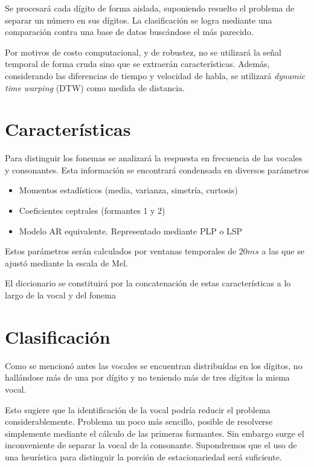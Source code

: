 \documentclass[a4paper]{article}
\begin{document}
		Se procesará cada dígito de forma aislada, suponiendo
		resuelto el problema de separar un número en sus dígitos.
		La clasificación se logra mediante una comparación contra una
		base de datos buscándose el más parecido.

		Por motivos de costo computacional, y de robustez, no se
		utilizará la señal temporal de forma cruda sino que se
		extraerán características.  Además, considerando las
		diferencias de tiempo y velocidad de habla, se utilizará
		\emph{dynamic time warping} (DTW) como medida de distancia.

	\section{Características}
		Para distinguir los fonemas se analizará la
		respuesta en frecuencia de las vocales y consonantes.
		Esta información se encontrará condensada en diversos
		parámetros %
			\begin{itemize} \itemsep0pt
				\item Momentos estadísticos (media, varianza, simetría, curtosis) 
				\item Coeficientes ceptrales (formantes 1 y 2) 
				\item Modelo AR equivalente. Representado mediante PLP o LSP
			\end{itemize}

		Estos parámetros serán calculados por ventanas
		temporales de $20ms$ a las que se ajustó mediante la
		escala de Mel.

		El diccionario se constituirá por la concatenación de
		estas características a lo largo de la vocal y del fonema

	\section{Clasificación}
		Como se mencionó antes las vocales se encuentran
		distribuídas en los dígitos, no hallándose más de
		una por dígito y no teniendo más de tres dígitos la
		misma vocal.

		Esto sugiere que la identificación de la vocal podría
		reducir el problema considerablemente.	Problema un poco
		más sencillo, posible de resolverse simplemente mediante
		el cálculo de las primeras formantes.	Sin embargo surge
		el inconveniente de separar la vocal de la consonante.
		Supondremos que el uso de una heurística para distinguir
		la porción de estacionariedad será suficiente.
\end{document}
